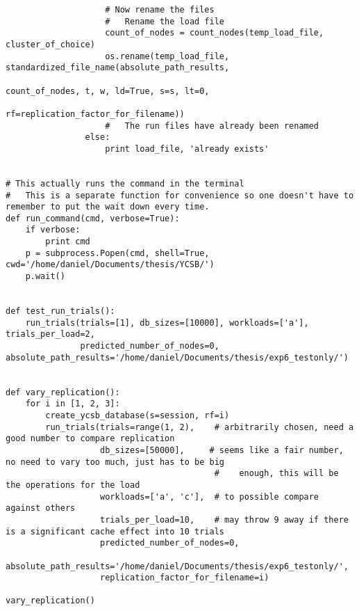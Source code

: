 \begin{verbatim}
                    # Now rename the files
                    #   Rename the load file
                    count_of_nodes = count_nodes(temp_load_file, cluster_of_choice)
                    os.rename(temp_load_file, standardized_file_name(absolute_path_results,
                                                                     count_of_nodes, t, w, ld=True, s=s, lt=0,
                                                                     rf=replication_factor_for_filename))
                    #   The run files have already been renamed
                else:
                    print load_file, 'already exists'


# This actually runs the command in the terminal
#   This is a separate function for convenience so one doesn't have to remember to put the wait down every time.
def run_command(cmd, verbose=True):
    if verbose:
        print cmd
    p = subprocess.Popen(cmd, shell=True, cwd='/home/daniel/Documents/thesis/YCSB/')
    p.wait()


def test_run_trials():
    run_trials(trials=[1], db_sizes=[10000], workloads=['a'], trials_per_load=2,
               predicted_number_of_nodes=0, absolute_path_results='/home/daniel/Documents/thesis/exp6_testonly/')


def vary_replication():
    for i in [1, 2, 3]:
        create_ycsb_database(s=session, rf=i)
        run_trials(trials=range(1, 2),    # arbitrarily chosen, need a good number to compare replication
                   db_sizes=[50000],     # seems like a fair number, no need to vary too much, just has to be big
                                          #    enough, this will be the operations for the load
                   workloads=['a', 'c'],  # to possible compare against others
                   trials_per_load=10,    # may throw 9 away if there is a significant cache effect into 10 trials
                   predicted_number_of_nodes=0,
                   absolute_path_results='/home/daniel/Documents/thesis/exp6_testonly/',
                   replication_factor_for_filename=i)

vary_replication()

\end{verbatim}